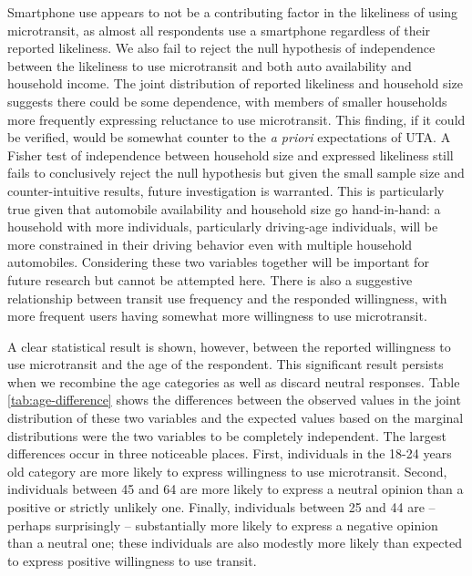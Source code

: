 \documentclass[smartcities,article,submit,moreauthors,pdftex]{mdpi}
\begin{document}
Smartphone use appears to not be a contributing factor in the likeliness of
using microtransit, as almost all respondents use a smartphone regardless of
their reported likeliness. We also fail to reject the null hypothesis of
independence between the likeliness to use microtransit and both auto
availability and household income. The joint distribution of reported likeliness
and household size suggests there could be some dependence, with members of
smaller households more frequently expressing reluctance to use microtransit.
This finding, if it could be verified, would be somewhat counter to the \emph{a
priori} expectations of UTA. A Fisher test of independence between
household size and expressed likeliness still fails to conclusively reject the
null hypothesis but given the small sample size and counter-intuitive results,
future investigation is warranted. This is particularly true given that
automobile availability and household size go hand-in-hand: a household with
more individuals, particularly driving-age individuals, will be more constrained
in their driving behavior even with multiple household automobiles. Considering
these two variables together will be important for future research but cannot be
attempted here. There is also a suggestive relationship between transit use
frequency and the responded willingness, with more frequent users having
somewhat more willingness to use microtransit.

A clear statistical result is shown, however, between the reported willingness
to use microtransit and the age of the respondent. This significant result
persists when we recombine the age categories as well as discard neutral
responses. Table \ref{tab:age-difference} shows the differences between the
observed values in the joint distribution of these two variables and the
expected values based on the marginal distributions were the two variables to be
completely independent. The largest differences occur in three noticeable
places. First, individuals in the 18-24 years old category are more likely to
express willingness to use microtransit. Second, individuals between 45 and 64
are more likely to express a neutral opinion than a positive or strictly
unlikely one. Finally, individuals between 25 and 44 are -- perhaps surprisingly
-- substantially more likely to express a negative opinion than a neutral one;
these individuals are also modestly more likely than expected to express
positive willingness to use transit.
\end{document}
